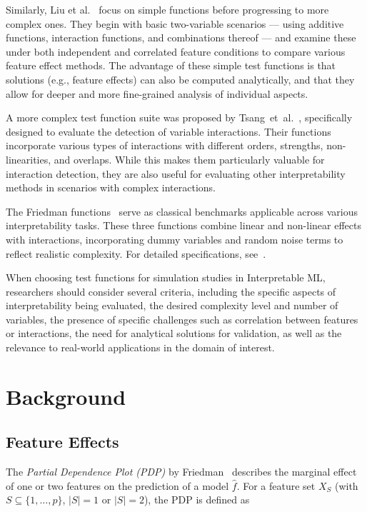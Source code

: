 \documentclass[runningheads]{llncs}
\begin{document}
Similarly, Liu et al.~\cite{liu_model_2018} focus on simple functions before
progressing to more complex ones. They begin with basic two-variable scenarios
--- using additive functions, interaction functions, and combinations thereof
--- and examine these under both independent and correlated feature conditions
to compare various feature effect methods. The advantage of these simple test
functions is that solutions (e.g., feature effects) can also be computed
analytically, and that they allow for deeper and more fine-grained analysis of
individual aspects.

A more complex test function suite was proposed by
Tsang~et~al.~\cite{tsang_detecting_2017}, specifically designed to evaluate the
detection of variable interactions. Their functions incorporate various types
of interactions with different orders, strengths, non-linearities, and
overlaps. While this makes them particularly valuable for interaction
detection, they are also useful for evaluating other interpretability methods
in scenarios with complex interactions.

The Friedman functions~\cite{breiman_bagging_1996,friedman_multivariate_1991}
serve as classical benchmarks applicable across various interpretability tasks.
These three functions combine linear and non-linear effects with interactions,
incorporating dummy variables and random noise terms to reflect realistic
complexity. For detailed specifications, see~\cite{breiman_bagging_1996}.

When choosing test functions for simulation studies in Interpretable ML,
researchers should consider several criteria, including the specific aspects of
interpretability being evaluated, the desired complexity level and number of
variables, the presence of specific challenges such as correlation between
features or interactions, the need for analytical solutions for validation, as
well as the relevance to real-world applications in the domain of interest.

\section{Background}\label{sec:background}

\subsection{Feature Effects}

The \textit{Partial Dependence Plot (PDP)} by
Friedman~\cite{friedman_greedy_2001} describes the marginal effect of one or
two features on the prediction of a model $\hat f$. For a feature set $X_S$
(with $S \subseteq \{1,\ldots,p\}$, $|S| = 1$ or $|S| = 2$), the PDP is defined
as
\end{document}
